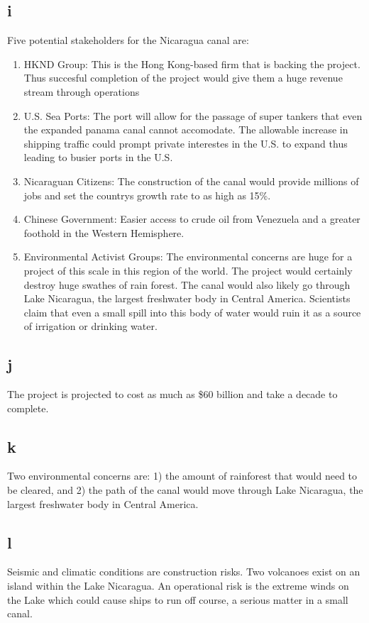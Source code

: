 \documentclass[12pt]{article} %
\begin{document}
	\subsection{i}
		Five potential stakeholders for the Nicaragua canal are:
		\begin{enumerate}
			\item HKND Group: This is the Hong Kong-based firm that is backing the project. Thus succesful completion of the project would give them a huge revenue stream through operations
			\item U.S. Sea Ports: The port will allow for the passage of super tankers that even the expanded panama canal cannot accomodate. The allowable increase in shipping traffic could prompt private interestes in the U.S. to expand thus leading to busier ports in the U.S.
			\item Nicaraguan Citizens: The construction of the canal would provide millions of jobs and set the countrys growth rate to as high as 15\%.
			\item Chinese Government: Easier access to crude oil from Venezuela and a greater foothold in the Western Hemisphere.
			\item Environmental Activist Groups: The environmental concerns are huge for a project of this scale in this region of the world. The project would certainly destroy huge swathes of rain forest. The canal would also likely go through Lake Nicaragua, the largest freshwater body in Central America. Scientists claim that even a small spill into this body of water would ruin it as a source of irrigation or drinking water.
		\end{enumerate}
		
	\subsection{j}
		The project is projected to cost as much as \$60 billion and take a decade to complete.
		
	\subsection{k}
		Two environmental concerns are: 1) the amount of rainforest that would need to be cleared, and 2) the path of the canal would move through Lake Nicaragua, the largest freshwater body in Central America.
		
	\subsection{l}
		Seismic and climatic conditions are construction risks. Two volcanoes exist on an island within the Lake Nicaragua. An operational risk is the extreme winds on the Lake which could cause ships to run off course, a serious matter in a small canal.
		
\end{document}
